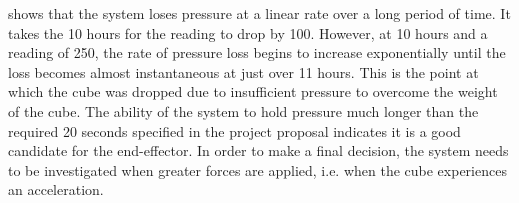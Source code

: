  shows that the system loses pressure at a linear rate over a long period of time. It takes the 10 hours for the reading to drop by 100. However, at 10 hours and a reading of 250, the rate of pressure loss begins to increase exponentially until the loss becomes almost instantaneous at just over 11 hours. This is the point at which the cube was dropped due to insufficient pressure to overcome the weight of the cube. The ability of the system to hold pressure much longer than the required 20 seconds specified in the project proposal indicates it is a good candidate for the end-effector. In order to make a final decision, the system needs to be investigated when greater forces are applied, i.e. when the cube experiences an acceleration.

\pendsign
